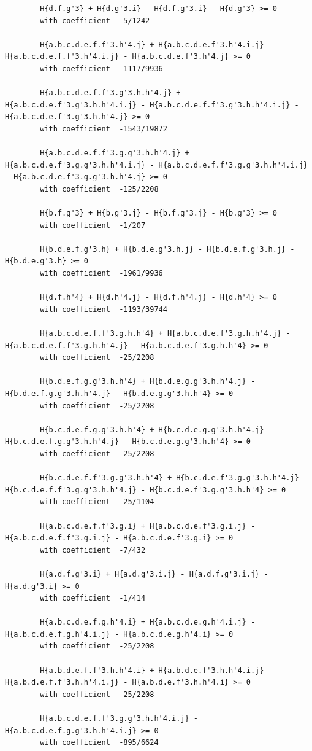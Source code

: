 \documentclass[11pt, a4paper]{kybernetika}
\begin{document}
\begin{verbatim}
		H{d.f.g'3} + H{d.g'3.i} - H{d.f.g'3.i} - H{d.g'3} >= 0
		with coefficient  -5/1242
		
		H{a.b.c.d.e.f.f'3.h'4.j} + H{a.b.c.d.e.f'3.h'4.i.j} - H{a.b.c.d.e.f.f'3.h'4.i.j} - H{a.b.c.d.e.f'3.h'4.j} >= 0
		with coefficient  -1117/9936
		
		H{a.b.c.d.e.f.f'3.g'3.h.h'4.j} + H{a.b.c.d.e.f'3.g'3.h.h'4.i.j} - H{a.b.c.d.e.f.f'3.g'3.h.h'4.i.j} - H{a.b.c.d.e.f'3.g'3.h.h'4.j} >= 0
		with coefficient  -1543/19872
		
		H{a.b.c.d.e.f.f'3.g.g'3.h.h'4.j} + H{a.b.c.d.e.f'3.g.g'3.h.h'4.i.j} - H{a.b.c.d.e.f.f'3.g.g'3.h.h'4.i.j} - H{a.b.c.d.e.f'3.g.g'3.h.h'4.j} >= 0
		with coefficient  -125/2208
		
		H{b.f.g'3} + H{b.g'3.j} - H{b.f.g'3.j} - H{b.g'3} >= 0
		with coefficient  -1/207
		
		H{b.d.e.f.g'3.h} + H{b.d.e.g'3.h.j} - H{b.d.e.f.g'3.h.j} - H{b.d.e.g'3.h} >= 0
		with coefficient  -1961/9936
		
		H{d.f.h'4} + H{d.h'4.j} - H{d.f.h'4.j} - H{d.h'4} >= 0
		with coefficient  -1193/39744
		
		H{a.b.c.d.e.f.f'3.g.h.h'4} + H{a.b.c.d.e.f'3.g.h.h'4.j} - H{a.b.c.d.e.f.f'3.g.h.h'4.j} - H{a.b.c.d.e.f'3.g.h.h'4} >= 0
		with coefficient  -25/2208
		
		H{b.d.e.f.g.g'3.h.h'4} + H{b.d.e.g.g'3.h.h'4.j} - H{b.d.e.f.g.g'3.h.h'4.j} - H{b.d.e.g.g'3.h.h'4} >= 0
		with coefficient  -25/2208
		
		H{b.c.d.e.f.g.g'3.h.h'4} + H{b.c.d.e.g.g'3.h.h'4.j} - H{b.c.d.e.f.g.g'3.h.h'4.j} - H{b.c.d.e.g.g'3.h.h'4} >= 0
		with coefficient  -25/2208
		
		H{b.c.d.e.f.f'3.g.g'3.h.h'4} + H{b.c.d.e.f'3.g.g'3.h.h'4.j} - H{b.c.d.e.f.f'3.g.g'3.h.h'4.j} - H{b.c.d.e.f'3.g.g'3.h.h'4} >= 0
		with coefficient  -25/1104
		
		H{a.b.c.d.e.f.f'3.g.i} + H{a.b.c.d.e.f'3.g.i.j} - H{a.b.c.d.e.f.f'3.g.i.j} - H{a.b.c.d.e.f'3.g.i} >= 0
		with coefficient  -7/432
		
		H{a.d.f.g'3.i} + H{a.d.g'3.i.j} - H{a.d.f.g'3.i.j} - H{a.d.g'3.i} >= 0
		with coefficient  -1/414
		
		H{a.b.c.d.e.f.g.h'4.i} + H{a.b.c.d.e.g.h'4.i.j} - H{a.b.c.d.e.f.g.h'4.i.j} - H{a.b.c.d.e.g.h'4.i} >= 0
		with coefficient  -25/2208
		
		H{a.b.d.e.f.f'3.h.h'4.i} + H{a.b.d.e.f'3.h.h'4.i.j} - H{a.b.d.e.f.f'3.h.h'4.i.j} - H{a.b.d.e.f'3.h.h'4.i} >= 0
		with coefficient  -25/2208
		
		H{a.b.c.d.e.f.f'3.g.g'3.h.h'4.i.j} - H{a.b.c.d.e.f.g.g'3.h.h'4.i.j} >= 0
		with coefficient  -895/6624
		

\end{verbatim}
\end{document}
